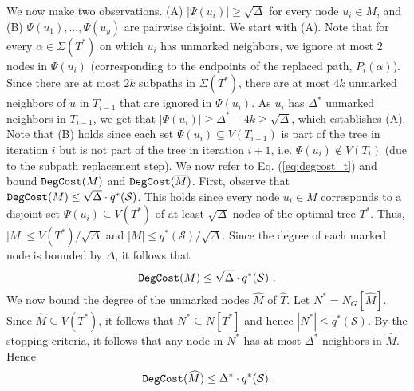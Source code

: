 \documentclass[12pt]{article}
\newcommand{\MAXDEG}[0]{\Delta}
\newcommand{\Terminals}[0]{\mathcal{S}}
\def\DegCost{\mbox{\tt DegCost}}
\def\HighDeg{\MAXDEG^{*}}
\begin{document}
We now make two observations. (A) $|\Psi(u_i)|\geq \sqrt{\MAXDEG}$ for every node $u_i \in M$, and (B) $\Psi(u_1),...,\Psi(u_{y})$ are pairwise disjoint. We start with (A). Note that for every $\alpha \in \Sigma(T^{*})$ on which $u_i$ has unmarked neighbors, we ignore at most $2$ nodes in $\Psi(u_i)$ (corresponding to the endpoints of the replaced path, $P_i(\alpha)$). Since there are at most $2k$ subpaths in $\Sigma(T^{*})$, there are at most $4k$ unmarked neighbors of $u$ in $T_{i-1}$ that are ignored in $\Psi(u_i)$. As $u_i$ has $\HighDeg$ unmarked neighbors in $T_{i-1}$, we get that
$|\Psi(u_i)| \geq \HighDeg-4k\geq \sqrt{\MAXDEG}$, which establishes (A). Note that (B) holds since each set $\Psi(u_i) \subseteq V(T_{i-1})$ is part of the tree in iteration $i$ but is not part of the tree in iteration $i+1$, i.e. $\Psi(u_i) \notin V(T_i)$ (due to the subpath replacement step).
We now refer to Eq. (\ref{eq:degcost_t}) and bound $\DegCost(M)$ and $\DegCost(\overline{M})$. First, observe that $\DegCost(M)\leq \sqrt{\MAXDEG} \cdot q^{*}(\Terminals)$. This holds since
every node $u_i \in M$ corresponds to a disjoint set $\Psi(u_i) \subseteq V(T^{*})$ of at least $\sqrt{\MAXDEG}$ nodes of the optimal tree $T^{*}$. Thus, $|M| \leq V(T^{*})/\sqrt{\MAXDEG}$ and $|M| \leq q^{*}(\Terminals)/\sqrt{\MAXDEG}$. Since the degree of each marked node is bounded by $\MAXDEG$, it follows that
\begin{equation}
\label{eq:degcost_M}
\DegCost(M) \leq \sqrt{\MAXDEG} \cdot q^{*}(\Terminals)~.
\end{equation}
We now bound the degree of the unmarked nodes $\widehat{M}$ of $\widehat{T}$. Let $N^{*}=N_G[\widehat{M}]$.
Since $\widehat{M} \subseteq V(T^{*})$, it follows that $N^{*} \subseteq N[T^{*}]$ and hence $|N^{*}| \leq q^{*}(\Terminals)$.
By the stopping criteria, it follows that any node in $N^{*}$ has at most $\HighDeg$ neighbors in $\widehat{M}$.
Hence
\begin{equation}
\label{eq:degcost_Mhat}
\DegCost(\widehat{M})\leq \HighDeg \cdot q^{*}(\Terminals).
\end{equation}
\end{document}
